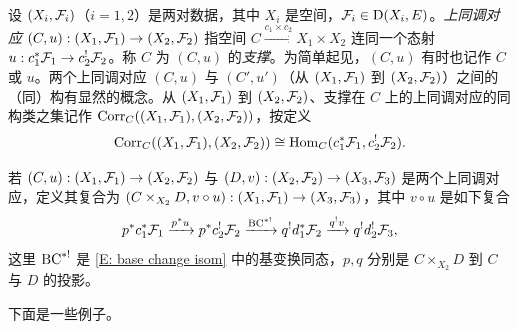 \begin{definition}
\label{AD:correspondences}
设 $(X_i,{\mathcal F}_i)$（$i=1,2$）是两对数据，其中 $X_i$ 是空间，${\mathcal F}_i\in \operatorname{D}(X_i,E)$。\emph{上同调对应} $(C,u):(X_1,{\mathcal F}_1)\to (X_2,{\mathcal F}_2)$ 指空间 $C\xrightarrow{c_1\times c_2} X_1\times  X_2$ 连同一个态射 $u:c_1^*{\mathcal F}_1\to c_2^!{\mathcal F}_2$。称 $C$ 为 $(C,u)$ 的\emph{支撑}。为简单起见，$(C,u)$ 有时也记作 $C$ 或 $u$。两个上同调对应 $(C,u)$ 与 $(C',u')$（从 $(X_1,{\mathcal F}_1)$ 到 $(X_2,{\mathcal F}_2)$）之间的（同）构有显然的概念。从 $(X_1,{\mathcal F}_1)$ 到 $(X_2,{\mathcal F}_2)$、支撑在 $C$ 上的上同调对应的同构类之集记作 $\operatorname{Corr}_C((X_1,{\mathcal F}_1),(X_2,{\mathcal F}_2))$，按定义
\[\operatorname{Corr}_C((X_1,{\mathcal F}_1),(X_2,{\mathcal F}_2))\cong {\operatorname{Hom}}_C(c_1^*{\mathcal F}_1,c_2^!{\mathcal F}_2).\]

若 $(C,u):(X_1,{\mathcal F}_1)\to (X_2,{\mathcal F}_2)$ 与 $(D,v):(X_2,{\mathcal F}_2)\to (X_3,{\mathcal F}_3)$ 是两个上同调对应，定义其复合为 $(C\times_{X_2}D,v\circ u):(X_1,{\mathcal F}_1)\to (X_3,{\mathcal F}_3)$，其中 $v\circ u$ 是如下复合
\[p^*c_1^*{\mathcal F}_1\xrightarrow{p^*u} p^*c_2^!{\mathcal F}_2\xrightarrow{\operatorname{BC}^{*!}} q^!d_1^*{\mathcal F}_2\xrightarrow{q^!v} q^!d_2^!{\mathcal F}_3,\]
这里 $\operatorname{BC}^{*!}$ 是 \eqref{E: base change isom} 中的基变换同态，$p,q$ 分别是 $C\times_{X_2}D$ 到 $C$ 与 $D$ 的投影。
\end{definition}

下面是一些例子。

